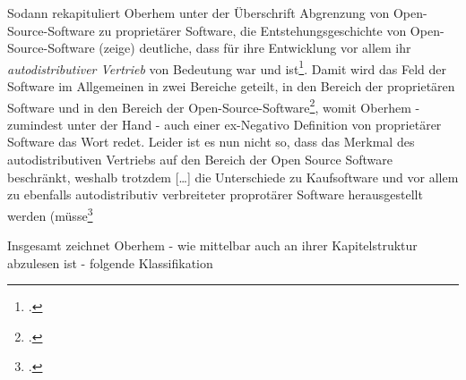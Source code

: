 \documentclass[DIV=calc,BCOR=5mm,11pt,headings=small,oneside,abstract=true, toc=bib]{scrartcl}
\begin{document}
Sodann rekapituliert Oberhem unter der Überschrift \glqq{}Abgrenzung von
Open-Source-Software zu proprietärer Software\grqq{}, \glqq{}die
Entstehungsgeschichte von Open-Source-Software (zeige) deutliche, dass für ihre
Entwicklung vor allem ihr \textit{autodistributiver Vertrieb} von Bedeutung war
und ist\grqq{}\footcite[vgl.][27]{Oberhem2008a}. Damit wird das Feld der
Software im Allgemeinen in zwei Bereiche geteilt, in den Bereich der
\glqq{}proprietären Software\grqq{} und in den Bereich der
\glqq{}Open-Source-Software\grqq{}\footcite[vgl.][27]{Oberhem2008a}, womit
Oberhem - zumindest unter der Hand - auch einer ex-Negativo Definition von
proprietärer Software das Wort redet. Leider ist es nun nicht so, dass das
Merkmal des \glqq{}autodistributiven Vertriebs\grqq{} auf den Bereich der Open
Source Software beschränkt, weshalb trotzdem \glqq{}[\ldots] die
Unterschiede zu Kaufsoftware und vor allem zu ebenfalls autodistributiv
verbreiteter proprotärer Software herausgestellt werden
(müsse\grqq{}\footcite[vgl.][27. BTW: Dieser 'Begriff' des 'autodistributiven
Vertriebs' klingt sicher gut, erhellt aber wenig. Zunächst wird er schwer den
Verdacht des Oxymorons loswerden. Distribution von Software ist irgendwie ja
auch Vertrieb - und umgekehrt. Und dann verteilt sich Software nicht selbst. Es
sind immer Menschen, die sich Software herunterladen oder gar anderen zusenden.
Es gibt schwerlich ein 'auto' in dieser Art der Distribution. Wir werden den
Begriff des 'autodistributiven Vertriebs' deshlab auch nicht weiter verfolgen,
so verführerisch er sich zunächst auch anbietet.]{Oberhem2008a}

Insgesamt zeichnet Oberhem - wie mittelbar auch an ihrer Kapitelstruktur
abzulesen ist - folgende Klassifikation
\end{document}
